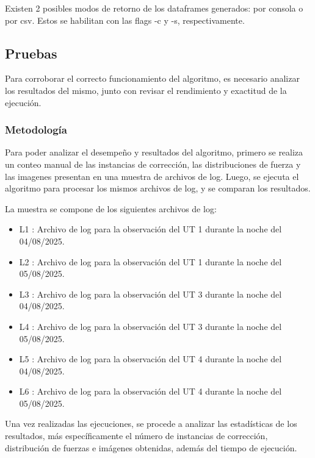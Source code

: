 Existen 2 posibles modos de retorno de los dataframes generados: por consola o por csv. Estos se habilitan con las flags -c y -s, respectivamente.

\subsection{Pruebas}

Para corroborar el correcto funcionamiento del algoritmo, es necesario analizar los resultados del mismo, junto con revisar el rendimiento y exactitud de la ejecución.

\subsubsection{Metodología}

Para poder analizar el desempeño y resultados del algoritmo, primero se realiza un conteo manual de las instancias de corrección, las distribuciones de fuerza y las imagenes presentan en una muestra de archivos de log. Luego, se ejecuta el algoritmo para procesar los mismos archivos de log, y se comparan los resultados. 

La muestra se compone de los siguientes archivos de log:

\begin{itemize}
    \item L1 : Archivo de log para la observación del UT 1 durante la noche del 04/08/2025.

    \item L2 : Archivo de log para la observación del UT 1 durante la noche del 05/08/2025.

    \item L3 : Archivo de log para la observación del UT 3 durante la noche del 04/08/2025.

    \item L4 : Archivo de log para la observación del UT 3 durante la noche del 05/08/2025.

    \item L5 : Archivo de log para la observación del UT 4 durante la noche del 04/08/2025.

    \item L6 : Archivo de log para la observación del UT 4 durante la noche del 05/08/2025.    
\end{itemize}

Una vez realizadas las ejecuciones, se procede a analizar las estadísticas de los resultados, más específicamente el número de instancias de corrección, distribución de fuerzas e imágenes obtenidas, además del tiempo de ejecución.

